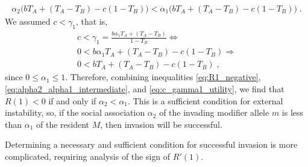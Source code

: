 \documentclass[12pt]{extarticle}
\begin{document}
\begin{appendices}
\begin{equation}
\begin{aligned}
\alpha_2 \big(b T_{A} + (T_A-T_B) - c(1-T_B)\big) <
\alpha_1 \big(b T_{A} + (T_A-T_B) - c(1-T_B)\big) \;.
\end{aligned}
\end{equation}
We assumed $c<\gamma_1$, that is,
\begin{equation} \label{eq:c_gamma1_utility}
\begin{aligned}
c < \gamma_1 = \frac{b \alpha_1 T_A + (T_A-T_B)}{1-T_B} \Leftrightarrow \\
0 < b \alpha_1 T_A + (T_A-T_B) - c(1-T_B) \Rightarrow \\
0 < b T_A + (T_A-T_B) - c(1-T_B) \;,
\end{aligned}
\end{equation}
since $0 \le \alpha_1 \le 1$.
Therefore, combining inequalities \ref{eq:R1_negative}, \ref{eq:alpha2_alpha1_intermediate}, and \ref{eq:c_gamma1_utility}, we find that $R(1)<0$ if and only if $\alpha_2 < \alpha_1$. This is a sufficient condition for external instability, so, if the social association $\alpha_2$ of the invading modifier allele $m$ is less than $\alpha_1$ of the resident $M$, then invasion will be successful.

Determining a necessary and sufficient condition for successful invasion is more complicated, requiring analysis of the sign of $R'(1)$.

  
  
  
\end{appendices}




\end{document}
